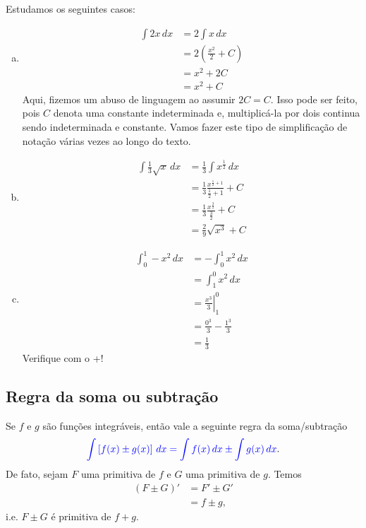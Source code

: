 \begin{ex}
  Estudamos os seguintes casos:
  \begin{enumerate}[a)]
  \item
    \begin{align}
      \int 2x\,dx &= 2\int x\,dx\\
                  &= 2\left(\frac{x^2}{2} + C\right)\\
                  &= x^2 + 2C\\
                  &= x^2 + C
    \end{align}
    Aqui, fizemos um abuso de linguagem ao assumir $2C = C$. Isso pode ser feito, pois $C$ denota uma constante indeterminada e, multiplicá-la por dois continua sendo indeterminada e constante. Vamos fazer este tipo de simplificação de notação várias vezes ao longo do texto.
  \item
    \begin{align}
      \int \frac{1}{3}\sqrt{x}\,dx &= \frac{1}{3}\int x^{\frac{1}{2}}\,dx\\
                                   &= \frac{1}{3}\frac{x^{\frac{1}{2}+1}}{\frac{1}{2}+1} + C\\
                                   &= \frac{1}{3}\frac{x^{\frac{3}{2}}}{\frac{3}{2}} + C\\
                                   &= \frac{2}{9}\sqrt{x^3} + C
    \end{align}
  \item
    \begin{align}
      \int_0^{1}-x^2\,dx &= -\int_0^1x^2\,dx\\
                         &= \int_1^0 x^2\,dx\\
                         &= \left.\frac{x^3}{3}\right|_1^0\\
                         &= \frac{0^3}{3} - \frac{1^3}{3}\\
                         &= \frac{1}{3}
    \end{align}
    \ifispython
    Verifique com o {\python}+{\sympy}!
    \fi
  \end{enumerate}
\end{ex}

\subsection{Regra da soma ou subtração}

Se $f$ e $g$ são funções integráveis, então vale a seguinte regra da soma/subtração
\begin{equation}
  {\color{blue}\int \left[f(x)\pm g(x)\right]\,dx = \int f(x)\,dx \pm \int g(x)\,dx}.
\end{equation}
De fato, sejam $F$ uma primitiva de $f$ e $G$ uma primitiva de $g$. Temos
\begin{align}
  (F \pm G)' &= F' \pm G'\\
             &= f \pm g,
\end{align}
i.e. $F \pm G$ é primitiva de $f+g$.

